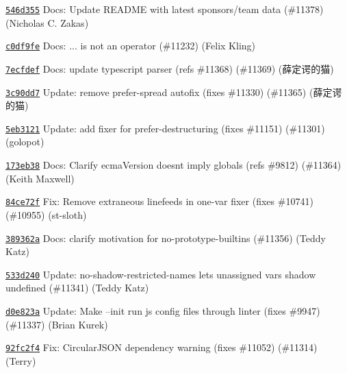 \begin{DoxyItemize}
\item \href{https://github.com/eslint/eslint/commit/546d355ace65631e27de859baea3ffcc50e0ad2c}{\texttt{ {\ttfamily 546d355}}} Docs\+: Update README with latest sponsors/team data (\#11378) (Nicholas C. Zakas)
\item \href{https://github.com/eslint/eslint/commit/c0df9febb7c7e045ababc10b88dbcbb3f28c724c}{\texttt{ {\ttfamily c0df9fe}}} Docs\+: {\ttfamily ...} is not an operator (\#11232) (Felix Kling)
\item \href{https://github.com/eslint/eslint/commit/7ecfdefaeadb772f8b96ffe37c4a2c97fde0da16}{\texttt{ {\ttfamily 7ecfdef}}} Docs\+: update typescript parser (refs \#11368) (\#11369) (薛定谔的猫)
\item \href{https://github.com/eslint/eslint/commit/3c90dd7e25cf97833deddb11cfbc107a5663ac08}{\texttt{ {\ttfamily 3c90dd7}}} Update\+: remove prefer-\/spread autofix (fixes \#11330) (\#11365) (薛定谔的猫)
\item \href{https://github.com/eslint/eslint/commit/5eb3121b82c1837da0c3021b7d9384bb30832e36}{\texttt{ {\ttfamily 5eb3121}}} Update\+: add fixer for {\ttfamily prefer-\/destructuring} (fixes \#11151) (\#11301) (golopot)
\item \href{https://github.com/eslint/eslint/commit/173eb38cdb3e4673cba947521f27158828186d77}{\texttt{ {\ttfamily 173eb38}}} Docs\+: Clarify ecma\+Version doesn\textquotesingle{}t imply globals (refs \#9812) (\#11364) (Keith Maxwell)
\item \href{https://github.com/eslint/eslint/commit/84ce72fdeba082b7b132e4ac6b714fb1a93831b7}{\texttt{ {\ttfamily 84ce72f}}} Fix\+: Remove extraneous linefeeds in {\ttfamily one-\/var} fixer (fixes \#10741) (\#10955) (st-\/sloth)
\item \href{https://github.com/eslint/eslint/commit/389362a06ac6601512b872d3e843c7371f2a1bcc}{\texttt{ {\ttfamily 389362a}}} Docs\+: clarify motivation for no-\/prototype-\/builtins (\#11356) (Teddy Katz)
\item \href{https://github.com/eslint/eslint/commit/533d240b0811f663494cb213b06cc9e51e1ff2d0}{\texttt{ {\ttfamily 533d240}}} Update\+: no-\/shadow-\/restricted-\/names lets unassigned vars shadow undefined (\#11341) (Teddy Katz)
\item \href{https://github.com/eslint/eslint/commit/d0e823aef196a6564c87a78b72c1ef980ce67af9}{\texttt{ {\ttfamily d0e823a}}} Update\+: Make --init run js config files through linter (fixes \#9947) (\#11337) (Brian Kurek)
\item \href{https://github.com/eslint/eslint/commit/92fc2f4f3faf8aeaae8a8e71db0de405404fb6c3}{\texttt{ {\ttfamily 92fc2f4}}} Fix\+: Circular\+JSON dependency warning (fixes \#11052) (\#11314) (Terry)

\end{DoxyItemize}
